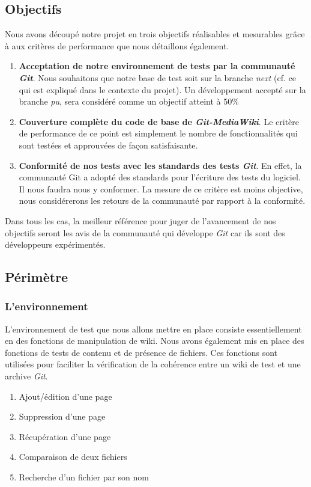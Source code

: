 \documentclass[11pt]{article}
\begin{document}
\subsection{Objectifs}
Nous avons découpé notre projet en trois objectifs réalisables et mesurables grâce à aux critères de performance que nous détaillons également.
\begin{enumerate}
\item \textbf{Acceptation de notre environnement de tests par la communauté \textit{Git}}. Nous souhaitons que notre base de test soit sur la branche \textit{next} (cf. ce qui est expliqué dans le contexte du projet). Un développement accepté sur la branche \textit{pu}, sera considéré comme un objectif atteint à 50\%
\item \textbf{Couverture complète du code de base de \textit{Git-MediaWiki}}. Le critère de performance de ce point est simplement le nombre de fonctionnalités qui sont testées et approuvées de façon satisfaisante.
\item \textbf{Conformité de nos tests avec les standards des tests \textit{Git}}. En effet, la communauté Git a adopté des standards pour l'écriture des tests du logiciel. Il nous faudra nous y conformer. La mesure de ce critère est moins objective, nous considérerons les retours de la communauté par rapport à la conformité.
\end{enumerate}
Dans tous les cas, la meilleur référence pour juger de l'avancement de nos objectifs seront les avis de la communauté qui développe \textit{Git} car ils sont des développeurs expérimentés.\\

\subsection{Périmètre}
\subsubsection{L'environnement}
L'environnement de test que nous allons mettre en place consiste essentiellement en des fonctions de manipulation de wiki. Nous avons également mis en place des fonctions de tests de contenu et de présence de fichiers. Ces fonctions sont utilisées pour faciliter la vérification de la cohérence entre un wiki de test et une archive \textit{Git}.
\begin{enumerate}
\item Ajout/édition d'une page
\item Suppression d'une page
\item Récupération d'une page
\item Comparaison de deux fichiers
\item Recherche d'un fichier par son nom
\end{enumerate}
\end{document}
